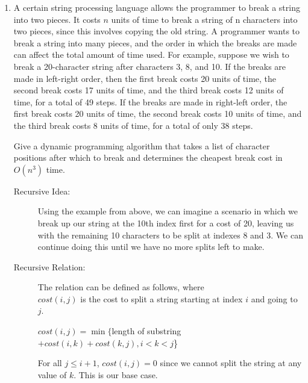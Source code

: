 \documentclass[12pt]{article}
\begin{document}
\begin{enumerate}
    \item A certain string processing language allows the programmer to break
    a string into two pieces. It costs $n$ units of time to break a string of n
    characters into two pieces, since this involves copying the old string. A
    programmer wants to break a string into many pieces, and the order in
    which the breaks are made can affect the total amount of time used. For
    example, suppose we wish to break a 20-character string after characters
    3, 8, and 10. If the breaks are made in left-right order, then the first
    break costs 20 units of time, the second break costs 17 units of time,
    and the third break costs 12 units of time, for a total of 49 steps. If
    the breaks are made in right-left order, the first break costs 20 units
    of time, the second break costs 10 units of time, and the third break
    costs 8 units of time, for a total of only 38 steps.
    
    Give a dynamic programming algorithm that takes a list of character positions
    after which to break and determines the cheapest break cost in $O(n^3)$ time.
    
    \begin{description}
        \item [Recursive Idea:] Using the example from above, we can imagine
        a scenario in which we break up our string at the 10th index first for a
        cost of 20, leaving us with the remaining 10 characters to be split at
        indexes 8 and 3. We can continue doing this until we have no more
        splits left to make.

        \item [Recursive Relation:] The relation can be defined as follows,
        where \\$cost(i,j)$ is the cost to split a string starting at index $i$ and
        going to $j$.
        
        $cost(i,j) = \min \{$length of substring$ + cost(i,k) + cost(k,j), i < k < j$\}

        For all $j \leq i+1$, $cost(i,j) = 0$ since we cannot split the string
        at any value of $k$. This is our base case.


\end{description}
\end{enumerate}
\end{document}
